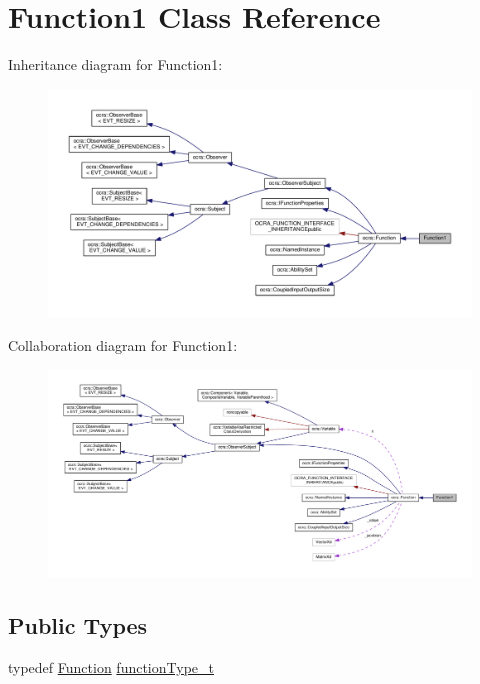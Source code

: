 \hypertarget{classFunction1}{}\section{Function1 Class Reference}
\label{classFunction1}


Inheritance diagram for Function1\+:
\nopagebreak
\begin{figure}[H]
\begin{center}
\leavevmode
\includegraphics[width=350pt]{dc/d8a/classFunction1__inherit__graph}
\end{center}
\end{figure}


Collaboration diagram for Function1\+:
\nopagebreak
\begin{figure}[H]
\begin{center}
\leavevmode
\includegraphics[width=350pt]{dd/d0a/classFunction1__coll__graph}
\end{center}
\end{figure}
\subsection*{Public Types}
\begin{DoxyCompactItemize}
\item 
typedef \hyperlink{classocra_1_1Function}{Function} \hyperlink{classFunction1_a3248b79eedbe37ed0e285db564a530fe}{function\+Type\+\_\+t}
\end{DoxyCompactItemize}
